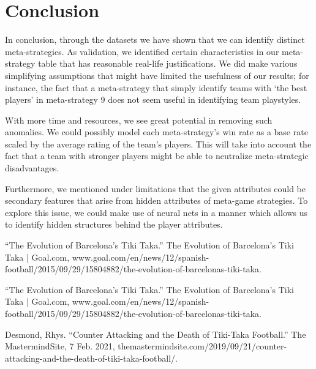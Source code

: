 \documentclass{article}
\begin{document}
\section{Conclusion}
In conclusion, through the datasets we have shown that we can identify distinct meta-strategies. As validation, we identified certain characteristics in our meta-strategy table that has reasonable real-life justifications. We did make various simplifying assumptions that might have limited the usefulness of our results; for instance, the fact that a meta-strategy that simply identify teams with `the best players' in meta-strategy 9 does not seem useful in identifying team playstyles. 
\par With more time and resources, we see great potential in removing such anomalies. We could possibly model each meta-strategy's win rate as a base rate scaled by the average rating of the team's players. This will take into account the fact that a team with stronger players might be able to neutralize meta-strategic disadvantages. 
\par Furthermore, we mentioned under limitations that the given attributes could be secondary features that arise from hidden attributes of meta-game strategies. To explore this issue, we could make use of neural nets in a manner which allows us to identify hidden structures behind the player attributes.  

\clearpage

\begin{thebibliography}{99} %

“The Evolution of Barcelona's Tiki Taka.” The Evolution of Barcelona's Tiki Taka | Goal.com, www.goal.com/en/news/12/spanish-football/2015/09/29/15804882/the-evolution-of-barcelonas-tiki-taka. 

“The Evolution of Barcelona's Tiki Taka.” The Evolution of Barcelona's Tiki Taka | Goal.com, www.goal.com/en/news/12/spanish-football/2015/09/29/15804882/the-evolution-of-barcelonas-tiki-taka. 

Desmond, Rhys. “Counter Attacking and the Death of Tiki-Taka Football.” The MastermindSite, 7 Feb. 2021, themastermindsite.com/2019/09/21/counter-attacking-and-the-death-of-tiki-taka-football/. 

\end{thebibliography}
\end{document}
